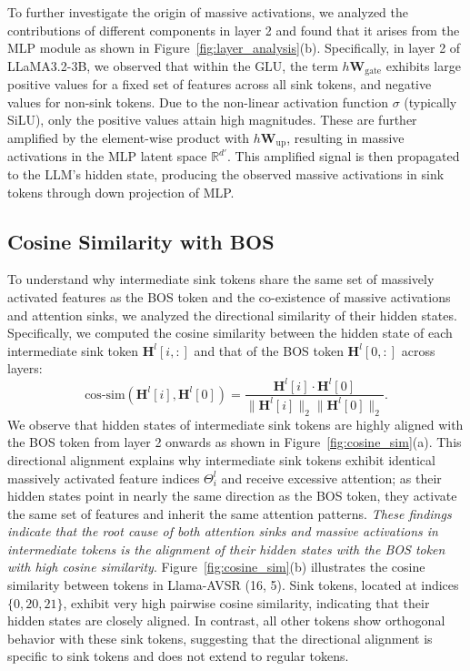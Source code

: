 \documentclass{article}
\begin{document}
To further investigate the origin of massive activations, we analyzed the contributions of different components in layer 2 and found that it arises from the MLP module as shown in Figure~\ref{fig:layer_analysis}(b). Specifically, in layer 2 of LLaMA3.2-3B, we observed that within the GLU, the term $h\textbf{W}_{\text{gate}}$ exhibits large positive values for a fixed set of features across all sink tokens, and negative values for non-sink tokens. Due to the non-linear activation function $\sigma$ (typically SiLU), only the positive values attain high magnitudes. These are further amplified by the element-wise product with $h\textbf{W}_{\text{up}}$, resulting in massive activations in the MLP latent space $\mathbb{R}^{d'}$. This amplified signal is then propagated to the LLM’s hidden state, producing the observed massive activations in sink tokens through down projection of MLP.


\subsection{Cosine Similarity with BOS}
\label{subsec:cosine_sim}
To understand why intermediate sink tokens share the same set of massively activated features as the BOS token and the co-existence of massive activations and attention sinks, we analyzed the directional similarity of their hidden states. Specifically, we computed the cosine similarity between the hidden state of each intermediate sink token $\textbf{H}^l[i,:]$ and that of the BOS token $\textbf{H}^l[0,:]$ across layers:
\begin{equation}
\text{cos-sim}(\textbf{H}^l[i], \textbf{H}^l[0]) = \frac{\textbf{H}^l[i] \cdot \textbf{H}^l[0]}{\|\textbf{H}^l[i]\|_2 \|\textbf{H}^l[0]\|_2}.
\end{equation}
We observe that hidden states of intermediate sink tokens are highly aligned with the BOS token from layer 2 onwards as shown in Figure~\ref{fig:cosine_sim}(a). This directional alignment explains why intermediate sink tokens exhibit identical massively activated feature indices $\Theta_i^l$ and receive excessive attention; as their hidden states point in nearly the same direction as the BOS token, they activate the same set of features and inherit the same attention patterns. \textit{These findings indicate that the root cause of both attention sinks and massive activations in intermediate tokens is the alignment of their hidden states with the BOS token with high cosine similarity}. Figure~\ref{fig:cosine_sim}(b) illustrates the cosine similarity between tokens in Llama-AVSR (16, 5). Sink tokens, located at indices $\{0,20,21\}$, exhibit very high pairwise cosine similarity, indicating that their hidden states are closely aligned. In contrast, all other tokens show orthogonal behavior with these sink tokens, suggesting that the directional alignment is specific to sink tokens and does not extend to regular tokens.
\end{document}
